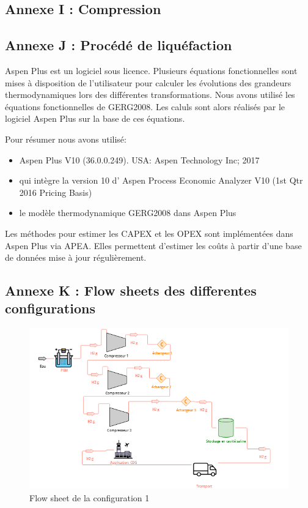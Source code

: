 \documentclass[11pt,french,a4paper]{article}
\begin{document}
\FloatBarrier
\subsection*{Annexe I : Compression}

\FloatBarrier
\subsection*{Annexe J : Procédé de liquéfaction} 

Aspen Plus est un logiciel sous licence. Plusieurs équations fonctionnelles sont mises à disposition de l'utilisateur pour calculer les évolutions des grandeurs thermodynamiques lors des différentes transformations. Nous avons utilisé les équations fonctionnelles de GERG2008. Les caluls sont alors réalisés par le logiciel Aspen Plus sur la base de ces équations.

Pour résumer nous avons utilisé:
\begin{itemize}
\item Aspen Plus V10 (36.0.0.249). USA: Aspen Technology Inc; 2017
\item qui intègre la version 10 d' Aspen Process Economic Analyzer V10 (1st Qtr 2016 Pricing Basis)
\item  le modèle thermodynamique GERG2008 dans Aspen Plus
\end{itemize}

Les méthodes pour estimer les CAPEX et les OPEX sont implémentées dans Aspen Plus via APEA. Elles permettent d'estimer les coûts à partir d'une base de données mise à jour régulièrement.


\newpage
\FloatBarrier
\subsection*{Annexe K : Flow sheets des differentes configurations} 

\begin{figure}[h]
\centering
\includegraphics[width=0.8\linewidth]{image/annexe/annexe_flow/figure1annexea.png}
\caption{Flow sheet de la configuration 1 }
\end{figure}
\end{document}
